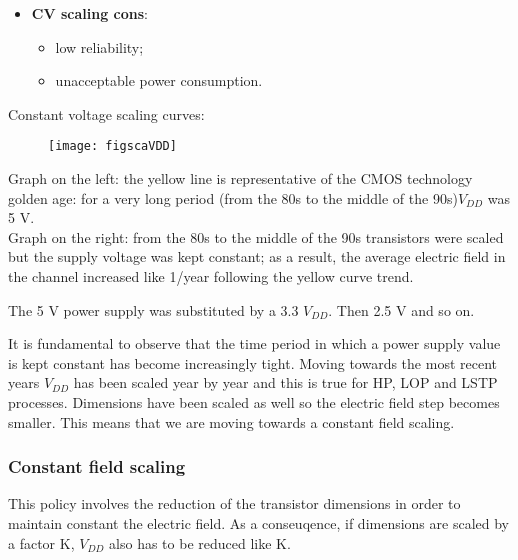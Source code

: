 \documentclass[a4paper, 12pt, twoside, openright]{report}
\begin{document}
{\begin{itemize}
\item \textbf{CV scaling cons}:
	
	\begin{itemize}
	\item low reliability;
	\item unacceptable power consumption.
	\end{itemize}

\end{itemize}

Constant voltage scaling curves:

	\begin{figure}[H]
	\centering
	\texttt{[image: figscaVDD]}
	\caption{}
	\label{}
	\end{figure}

Graph on the left: the yellow line is representative of the CMOS technology golden age: for a very long period (from the 80s to the middle of the 90s)$ V_{DD}$ was 5 V.\\
Graph on the right: from the 80s to the middle of the 90s transistors were scaled but the supply voltage was kept constant; as a result, the average electric field in the channel increased like 1/year following the yellow curve trend.

The 5 V power supply was substituted by a 3.3 $V_{DD}$. Then 2.5 V and so on. 

It is fundamental to observe that the time period in which a power supply value is kept constant has become increasingly tight. Moving towards the most recent years $V_{DD}$ has been scaled year by year and this is true for HP, LOP and LSTP processes. Dimensions have been scaled as well so the electric field step becomes smaller. This means that we are moving towards a constant field scaling.

\newpage

\subsubsection{Constant field scaling}

This policy involves the reduction of the transistor dimensions in order to maintain constant the electric field. As a conseuqence, if dimensions are scaled by a factor K, $V_{DD}$ also has to be reduced like K.

}
\end{document}
